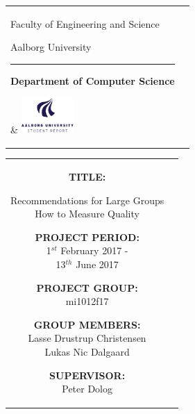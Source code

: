 \begin{titlepage}
\thispagestyle{empty}

\begin{nopagebreak}
{\samepage

\begin{tabular}{lr}
        \parbox{14.5cm}{
          {\LARGE Faculty of Engineering and Science}

          {\small Aalborg University}
          \vspace{-0.3cm}\\
        \hrule
        \vspace{0.2cm}
          {\bf Department of Computer Science}
         }   & \hspace{-2.0cm} \includegraphics[width=2cm]{graphics/aau_logo_en}
\end{tabular}

\begin{tabular}{cc}
\parbox{7cm}{
\hspace{2cm}
\begin{description}

\item {\bf TITLE:}

Recommendations for Large Groups \\
How to Measure Quality 


\end{description}

\parbox{8cm}{

\begin{description}
        \item {\bf PROJECT PERIOD:}\\
          1$^{st}$ February 2017 -\\ 13$^{th}$ June 2017\\
          \hspace{4cm}
        \item {\bf PROJECT GROUP:}\\
          mi1012f17\\
          \hspace{4cm}
        \item {\bf GROUP MEMBERS:}\\
          Lasse Drustrup Christensen \\
          Lukas Nic Dalgaard 
          \hspace{2cm}
        \item {\bf SUPERVISOR:}\\
          Peter Dolog
\end{description}
}

}
\end{tabular}}
\end{nopagebreak}
\end{titlepage}
